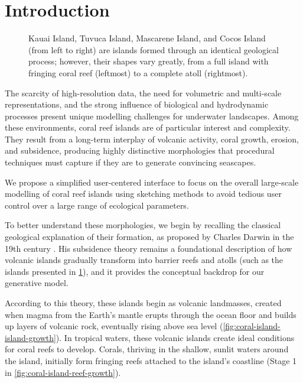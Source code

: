 \section{Introduction}
\label{sec:coral-island-introduction}

\begin{figure}[H]
    \caption[Different islands with coral reefs]{Kauai Island, Tuvuca Island, Mascarene Island, and Cocos Island (from left to right) are islands formed through an identical geological process; however, their shapes vary greatly, from a full island with fringing coral reef (leftmost) to a complete atoll (rightmost).}
    \label{fig:coral-island-island-examples}
\end{figure}

The scarcity of high-resolution data, the need for volumetric and multi-scale representations, and the strong influence of biological and hydrodynamic processes present unique modelling challenges for underwater landscapes. Among these environments, coral reef islands are of particular interest and complexity. They result from a long-term interplay of volcanic activity, coral growth, erosion, and subsidence, producing highly distinctive morphologies that procedural techniques must capture if they are to generate convincing seascapes. 

We propose a simplified user-centered interface to focus on the overall large-scale modelling of coral reef islands using sketching methods to avoid tedious user control over a large range of ecological parameters.

To better understand these morphologies, we begin by recalling the classical geological explanation of their formation, as proposed by Charles Darwin in the 19th century \cite{Darwin1842}. His subsidence theory remains a foundational description of how volcanic islands gradually transform into barrier reefs and atolls (such as the islands presented in \cref{fig:coral-island-island-examples}), and it provides the conceptual backdrop for our generative model.

According to this theory, these islands begin as volcanic landmasses, created when magma from the Earth's mantle erupts through the ocean floor and builds up layers of volcanic rock, eventually rising above sea level (\cref{fig:coral-island-island-growth}). In tropical waters, these volcanic islands create ideal conditions for coral reefs to develop. Corals, thriving in the shallow, sunlit waters around the island, initially form fringing reefs attached to the island's coastline (Stage 1 in \cref{fig:coral-island-reef-growth}).


